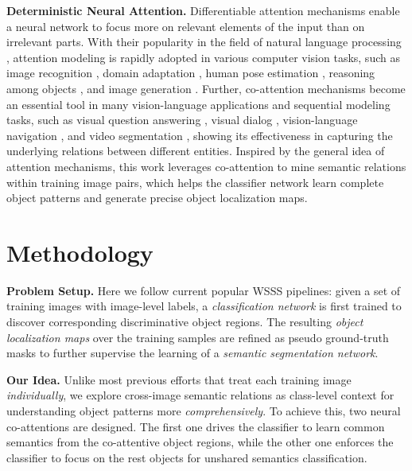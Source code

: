 \documentclass[runningheads]{llncs}
\begin{document}
\noindent\textbf{Deterministic Neural Attention.} Differentiable attention mechanisms enable a neural network to focus more on relevant elements of the input than on irrelevant parts.  With their popularity in the field of natural language processing \cite{vaswani2017attention,luong2015effective,cheng2016long,lin2017structured,paulus2017deep}, attention modeling  is rapidly adopted in various computer vision tasks, such as image recognition \cite{fu2019dual,mamc2018,wang2018non,hu2018squeeze,woo2018cbam}, domain adaptation \cite{wang2019transferable,zhang2019sequence}, human pose estimation \cite{wang2020hierarchical,chu2017multi,ye2016spatial}, reasoning among objects \cite{zhou2020cascaded,santoro2017simple}, and image generation \cite{zhu2019progressive,zhang2018self,xu2018attngan}. Further, co-attention mechanisms become an essential tool in many vision-language applications and sequential modeling tasks, such as visual question answering \cite{lu2016hierarchical,xiong2016dynamic,nguyen2018improved,yu2019deep}, visual dialog \cite{zheng2019reasoning,wu2018you}, vision-language navigation \cite{wang2019reinforced}, and video segmentation \cite{wang2019zero,lu2019see}, showing its effectiveness in capturing the underlying relations between different entities. Inspired by the general idea of attention mechanisms, this work leverages co-attention to mine semantic relations within training image pairs, which helps the classifier network learn complete object patterns and generate precise object localization maps. 




\vspace{-7pt}
\section{Methodology}
\label{sec:method}
\vspace{-3pt}
\noindent\textbf{Problem Setup.} Here we follow current popular WSSS pipelines: given a set of training images with image-level labels, a \textit{classification network} is first trained to discover corresponding discriminative object regions. The resulting \textit{object localization maps} over the training samples are refined as pseudo ground-truth masks to further supervise the learning of a \textit{semantic segmentation network}.

\noindent\textbf{Our Idea.} Unlike most previous efforts that treat each training image \textit{individually}, we explore cross-image
semantic relations as class-level context for understanding object patterns more \textit{comprehensively}. To achieve this, two neural co-attentions are designed. The first one drives the classifier to learn common semantics from the co-attentive object regions, while the other one enforces the classifier to focus on the rest objects for unshared  semantics classification. 
\end{document}
